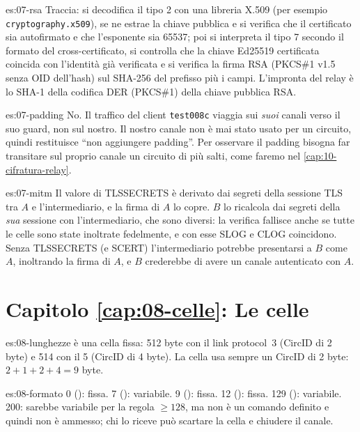 \begin{soluzione}{es:07-rsa}
Traccia: si decodifica il tipo 2 con una libreria X.509 (per esempio \texttt{cryptography.x509}), se ne estrae la chiave pubblica e si verifica che il certificato sia autofirmato e che l'esponente sia 65537; poi si interpreta il tipo 7 secondo il formato del cross-certificato, si controlla che la chiave Ed25519 certificata coincida con l'identità già verificata e si verifica la firma RSA (PKCS\#1 v1.5 senza OID dell'hash) sul SHA-256 del prefisso più i campi. L'impronta del relay è lo SHA-1 della codifica DER (PKCS\#1) della chiave pubblica RSA.
\end{soluzione}

\begin{soluzione}{es:07-padding}
No. Il traffico del client \texttt{test008c} viaggia sui \emph{suoi} canali verso il suo guard, non sul nostro. Il nostro canale non è mai stato usato per un circuito, quindi  restituisce \enquote{non aggiungere padding}. Per osservare il padding bisogna far transitare sul proprio canale un circuito di più salti, come faremo nel \cref{cap:10-cifratura-relay}.
\end{soluzione}

\begin{soluzione}{es:07-mitm}
Il valore di TLSSECRETS è derivato dai segreti della sessione TLS tra $A$ e l'intermediario, e la firma di $A$ lo copre. $B$ lo ricalcola dai segreti della \emph{sua} sessione con l'intermediario, che sono diversi: la verifica fallisce anche se tutte le celle sono state inoltrate fedelmente, e con esse SLOG e CLOG coincidono. Senza TLSSECRETS (e SCERT) l'intermediario potrebbe presentarsi a $B$ come $A$, inoltrando la firma di $A$, e $B$ crederebbe di avere un canale autenticato con $A$.
\end{soluzione}

\section*{Capitolo \ref{cap:08-celle}: Le celle}

\begin{soluzione}{es:08-lunghezze}
 è una cella fissa: 512 byte con il link protocol~3 (CircID di 2 byte) e 514 con il 5 (CircID di 4 byte). La cella  usa sempre un CircID di 2 byte: $2 + 1 + 2 + 4 = 9$ byte.
\end{soluzione}

\begin{soluzione}{es:08-formato}
0 (): fissa. 7 (): variabile. 9 (): fissa. 12 (): fissa. 129 (): variabile. 200: sarebbe variabile per la regola $\ge 128$, ma non è un comando definito e quindi non è ammesso; chi lo riceve può scartare la cella e chiudere il canale.
\end{soluzione}

